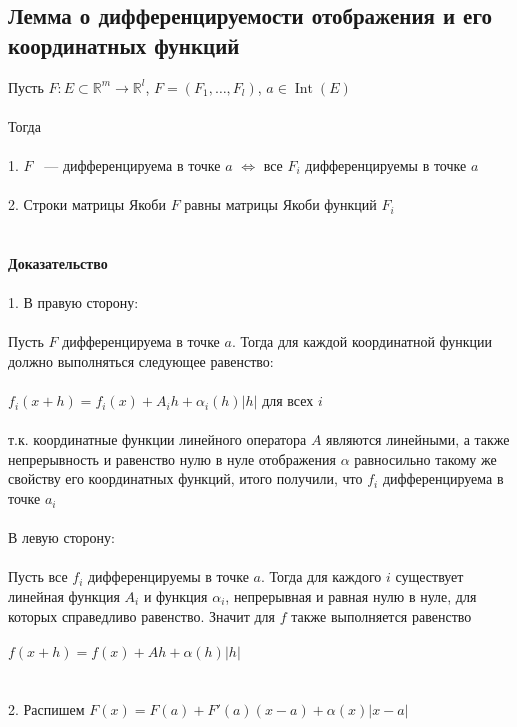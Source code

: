 \documentclass[../main.tex]{subfiles}
\begin{document}
\subsection{Лемма о дифференцируемости отображения и его координатных функций}
Пусть $F : E \subset \mathbb{R}^m \rightarrow \mathbb{R}^l$, $F = (F_1, \ldots, F_l)$, $a \in \operatorname{Int} (E)$\\\\
Тогда \\\\
1. $F$ ~--- дифференцируема в точке $a$ $\Leftrightarrow$ все $F_i$ дифференцируемы в точке $a$\\\\
2. Строки матрицы Якоби $F$ равны матрицы Якоби функций $F_i$ \\\\\\
\textbf{Доказательство}        \\\\
1. В правую сторону:\\\\
Пусть $F$ дифференцируема в точке $a$. Тогда для каждой координатной функции должно выполняться следующее равенство:\\\\
$f_i(x + h) = f_i(x) + A_ih + \alpha_i(h) |h|$ для всех $i$\\\\
т.к. координатные функции линейного оператора $A$ являются линейными, а также непрерывность и равенство нулю в нуле отображения $\alpha$ равносильно такому же свойству его координатных функций, итого получили, что $f_i$ дифференцируема в точке $a_i$\\\\
В левую сторону:\\\\
Пусть все $f_i$ дифференцируемы в точке $a$. Тогда для каждого $i$ существует линейная функция $A_i$ и функция $\alpha_i$, непрерывная и равная нулю в нуле, для которых справедливо равенство. Значит для $f$ также выполняется равенство\\\\
$f(x + h) = f(x) + Ah + \alpha(h) |h|$\\\\\\
2. Распишем $F(x) = F(a) + F'(a)(x - a) + \alpha(x) |x - a|$ \\\\
\end{document}
